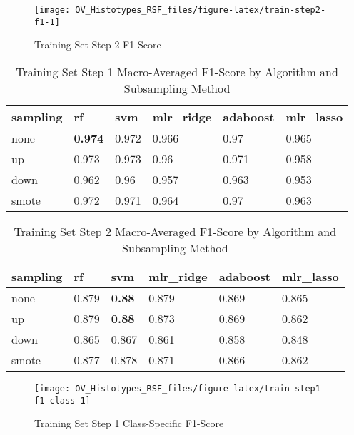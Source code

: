 \documentclass[
]{report}
\begin{document}
\begin{figure}[H]

{\centering \texttt{[image: OV\_Histotypes\_RSF\_files/figure-latex/train-step2-f1-1]} 

}

\caption{Training Set Step 2 F1-Score}\label{fig:train-step2-f1}
\end{figure}

\begin{table}

\caption{\label{tab:train-step1-f1-table}Training Set Step 1 Macro-Averaged F1-Score by Algorithm and Subsampling Method}
\centering
\begin{tabular}[t]{l|l|l|l|l|l}
\hline
sampling & rf & svm & mlr\_ridge & adaboost & mlr\_lasso\\
\hline
none & \textbf{0.974} & 0.972 & 0.966 & 0.97 & 0.965\\
\hline
up & 0.973 & 0.973 & 0.96 & 0.971 & 0.958\\
\hline
down & 0.962 & 0.96 & 0.957 & 0.963 & 0.953\\
\hline
smote & 0.972 & 0.971 & 0.964 & 0.97 & 0.963\\
\hline
\end{tabular}
\end{table}

\begin{table}

\caption{\label{tab:train-step2-f1-table}Training Set Step 2 Macro-Averaged F1-Score by Algorithm and Subsampling Method}
\centering
\begin{tabular}[t]{l|l|l|l|l|l}
\hline
sampling & rf & svm & mlr\_ridge & adaboost & mlr\_lasso\\
\hline
none & 0.879 & \textbf{0.88} & 0.879 & 0.869 & 0.865\\
\hline
up & 0.879 & \textbf{0.88} & 0.873 & 0.869 & 0.862\\
\hline
down & 0.865 & 0.867 & 0.861 & 0.858 & 0.848\\
\hline
smote & 0.877 & 0.878 & 0.871 & 0.866 & 0.862\\
\hline
\end{tabular}
\end{table}

\begin{figure}[H]

{\centering \texttt{[image: OV\_Histotypes\_RSF\_files/figure-latex/train-step1-f1-class-1]} 

}

\caption{Training Set Step 1 Class-Specific F1-Score}\label{fig:train-step1-f1-class}
\end{figure}
\end{document}

